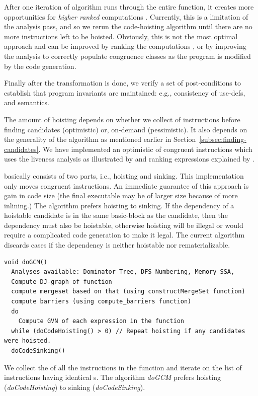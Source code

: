 \documentclass[acmlarge,review,anonymous]{acmart}\settopmatter{printfolios=true}
\begin{document}
After one iteration of algorithm runs through the entire function, it creates
more opportunities for \emph{higher ranked} computations
\cite{rosen1988global}. Currently, this is a limitation of the \GVN{} analysis
pass, and so we rerun the code-hoisting algorithm until there are no more
instructions left to be hoisted.  Obviously, this is not the most optimal
approach and can be improved by ranking the computations \cite{rosen1988global},
or by improving the \GVN{} analysis to correctly populate congruence classes as
the program is modified by the code generation.

Finally after the transformation is done, we verify a set of post-conditions to
establish that program invariants are maintained: e.g., consistency of use-defs,
and \SSA{} semantics.

The amount of hoisting depends on whether we collect \GVN{} of instructions
before finding candidates (optimistic) or, on-demand (pessimistic). It also
depends on the generality of the \GVN{} algorithm as mentioned earlier in
Section~\ref{subsec:finding-candidates}. We have implemented an optimistic
\gcm{} of congruent instructions which uses the liveness analysis as
illustrated by \citet{das2012} and ranking expressions explained by
\citet{rosen1988global}.

\GCM{} basically consists of two parts, i.e., hoisting and sinking. This
implementation only moves congruent instructions. An immediate guarantee of this
approach is gain in code size (the final executable may be of larger size
because of more inlining.) The algorithm prefers hoisting to sinking. If the
dependency of a hoistable candidate is in the same basic-block as the candidate,
then the dependency must also be hoistable, otherwise hoisting will be illegal or
would require a complicated code generation to make it legal. The current
algorithm discards cases if the dependency is neither hoistable nor
rematerializable.

\begin{verbatim}
void doGCM()
  Analyses available: Dominator Tree, DFS Numbering, Memory SSA,
  Compute DJ-graph of function
  compute mergeset based on that (using constructMergeSet function)
  compute barriers (using compute_barriers function)
  do
    Compute GVN of each expression in the function
  while (doCodeHoisting() > 0) // Repeat hoisting if any candidates were hoisted.
  doCodeSinking()
\end{verbatim}

We collect the \GVN{} of all the instructions in the function and iterate on the
list of instructions having identical \GVN{}s. The algorithm \emph{doGCM}
prefers hoisting (\emph{doCodeHoisting}) to sinking (\emph{doCodeSinking}).
\end{document}
